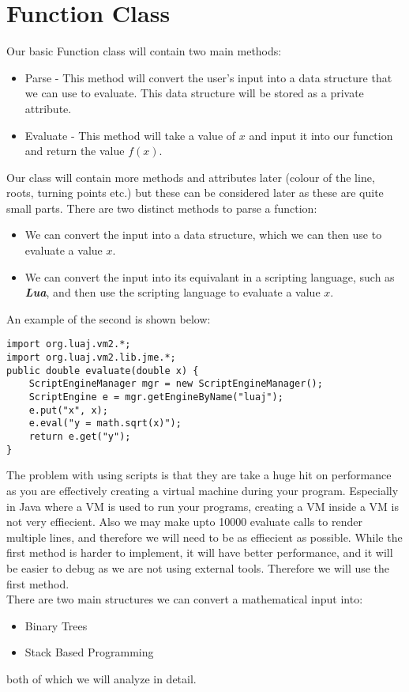 \documentclass[../../../../main.tex]{subfiles}
\begin{document}
\section{Function Class}	\label{funcClass}
Our basic Function class will contain two main methods:
\begin{itemize}
	\item Parse - This method will convert the user's input into a data structure that we can use to evaluate. This data structure will be stored as a private attribute.
	\item Evaluate - This method will take a value of $x$ and input it into our function and return the value $f(x)$.
\end{itemize}
Our class will contain more methods and attributes later (colour of the line, roots, turning points etc.) but these can be considered later as these are quite small parts. There are two distinct methods to parse a function:
\begin{itemize}
	\item We can convert the input into a data structure, which we can then use to evaluate a value $x$.
	\item We can convert the input into its equivalant in a scripting language, such as \textit{\textbf{Lua}}\cite{lua}, and then use the scripting language to evaluate a value $x$.
\end{itemize}
An example of the second is shown below:
\begin{verbatim}
import org.luaj.vm2.*;
import org.luaj.vm2.lib.jme.*;
public double evaluate(double x) {
	ScriptEngineManager mgr = new ScriptEngineManager();
	ScriptEngine e = mgr.getEngineByName("luaj");
	e.put("x", x);
	e.eval("y = math.sqrt(x)");
	return e.get("y");	
}
\end{verbatim}
The problem with using scripts is that they are take a huge hit on performance as you are effectively creating a virtual machine during your program. Especially in Java where a VM is used to run your programs, creating a VM inside a VM is not very effiecient. Also we may make upto 10000 evaluate calls to render multiple lines, and therefore we will need to be as effiecient as possible. While the first method is harder to implement, it will have better performance, and it will be easier to debug as we are not using external tools. Therefore we will use the first method.\\
There are two main structures we can convert a mathematical input into:
\begin{itemize}
	\item Binary Trees
	\item Stack Based Programming
\end{itemize}
both of which we will analyze in detail.
\newpage
\end{document}
